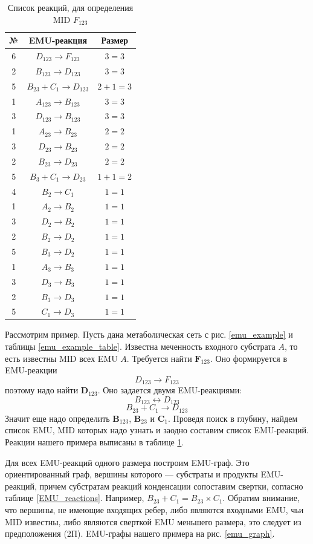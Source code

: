 \documentclass[14pt, a4paper]{extreport}
\begin{document}
\clearpage
\begin{table}
	\begin{tabular}{c c c}
		\hline
		№ & EMU-реакция & Размер\\
		\hline
		6 & $D_{123} \to F_{123}$ & $3 = 3$\\
		2 & $B_{123} \to D_{123}$ & $3 = 3$\\
		5 & $B_{23} + C_1 \to D_{123}$ & $2 + 1 = 3$\\
		1 & $A_{123} \to B_{123}$ & $3 = 3$\\
		3 & $D_{123} \to B_{123}$ & $3 = 3$\\
		1 & $A_{23} \to B_{23}$ & $2 = 2$\\
		3 & $D_{23} \to B_{23}$ & $2 = 2$\\
		2 & $B_{23} \to D_{23}$ & $2 = 2$\\
		5 & $B_3 + C_1 \to D_{23}$ & $1 + 1 = 2$\\
		4 & $B_2 \to C_1$ & $1 = 1$\\
		1 & $A_2 \to B_2$ & $1 = 1$\\
		3 & $D_2 \to B_2$ & $1 = 1$\\
		2 & $B_2 \to D_2$ & $1 = 1$\\
		5 & $B_3 \to D_2$ & $1 = 1$\\
		1 & $A_3 \to B_3$ & $1 = 1$\\
		3 & $D_3 \to B_3$ & $1 = 1$\\
		2 & $B_3 \to D_3$ & $1 = 1$\\
		5 & $C_1 \to D_3$ & $1 = 1$\\
	\end{tabular}
	\caption{Список реакций, для определения MID $F_{123}$}
	\label{all_emu_reactions}
\end{table}


Рассмотрим пример. Пусть дана метаболическая сеть с рис. \ref{emu_example} и таблицы \ref{emu_example_table}. Известна меченность входного субстрата $A$, то есть известны MID всех EMU $A$. Требуется найти $\mathbf{F}_{123}$. Оно формируется в EMU-реакции $$D_{123} \to F_{123}$$ поэтому надо найти $\mathbf{D}_{123}$. Оно задается двумя EMU-реакциями: $$B_{123} \leftrightarrow D_{123}$$ $$B_{23} + C_1 \to D_{123}$$Значит еще надо определить $\mathbf{B}_{123}$, $\mathbf{B}_{23}$ и $\mathbf{C}_1$. Проведя поиск в глубину, найдем список EMU, MID которых надо узнать и заодно составим список EMU-реакций. Реакции нашего примера выписаны в таблице \ref{all_emu_reactions}.

Для всех EMU-реакций одного размера построим EMU-граф. Это ориентированный граф, вершины которого --- субстраты и продукты EMU-реакций, причем субстратам реакций конденсации сопоставим свертки, согласно таблице \ref{EMU_reactions}. Например, $B_{23} + C_1 = B_{23} \times C_1$. Обратим внимание, что вершины, не имеющие входящих ребер, либо являются входными EMU, чьи MID известны, либо являются сверткой EMU меньшего размера, это следует из предположения (2П). EMU-графы нашего примера на рис. \ref{emu_graph}.
\end{document}
